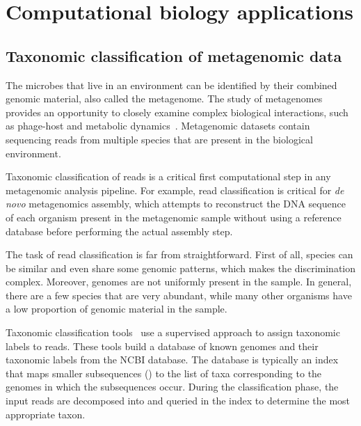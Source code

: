 
\section{Computational biology applications}


\subsection{Taxonomic classification of metagenomic data}


The microbes that live in an environment can be identified by their combined genomic material, also called the metagenome.
The study of metagenomes provides an opportunity to closely examine complex biological interactions, such as phage-host and metabolic dynamics~\cite{national2007new}.
Metagenomic datasets contain sequencing reads from multiple species that are present in the biological environment. 

Taxonomic classification of reads is a critical first computational step in any metagenomic analysis pipeline.
For example, read classification is critical for \emph{de novo} metagenomics assembly, which attempts to reconstruct the DNA sequence of each organism present in the metagenomic sample without using a reference database before performing the actual assembly step.

The task of read classification is far from straightforward.
First of all, species can be similar and even share some genomic patterns, which makes the discrimination complex. 
Moreover, genomes are not uniformly present in the sample.
In general, there are a few species that are very abundant, while many other organisms have a low proportion of genomic material in the sample.

Taxonomic classification tools~\cite{ames2013scalable, kim2016centrifuge, menzel2016fast, wood2014kraken, wood2019improved, dilthey2019strain,liu2018novel} use a supervised approach to assign taxonomic labels to reads.
These tools build a database of known genomes and their taxonomic labels from the NCBI database. 
The database is typically an index that maps smaller subsequences (\kmers) to the list of taxa corresponding to the genomes in which the subsequences occur. 
During the classification phase, the input reads are decomposed into \kmers and queried in the index to determine the most appropriate taxon.


